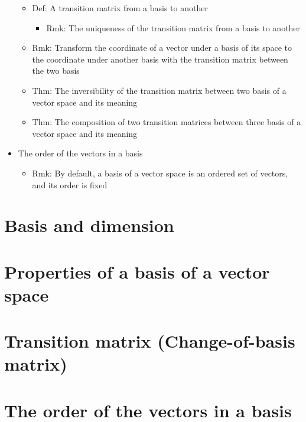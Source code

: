\documentclass[onecolumn]{ctexart}
\begin{document}
\begin{itemize}
\begin{itemize}
    \item Def: A transition matrix from a basis to another
    \begin{itemize}
      \item Rmk: The uniqueness of the transition matrix from a basis to another
    \end{itemize}
    \item Rmk: Transform the coordinate of a vector under a basis of its space to the coordinate under another basis with the transition matrix between the two basis
    \item Thm: The inversibility of the transition matrix between two basis of a vector space and its meaning
    \item Thm: The composition of two transition matrices between three basis of a vector space and its meaning
  \end{itemize}
  \item The order of the vectors in a basis
  \begin{itemize}
    \item Rmk: By default, a basis of a vector space is an ordered set of vectors, and its order is fixed
  \end{itemize}
\end{itemize}

\section{Basis and dimension}

\section{Properties of a basis of a vector space}

\section{Transition matrix (Change-of-basis matrix)}

\section{The order of the vectors in a basis}
\end{document}

